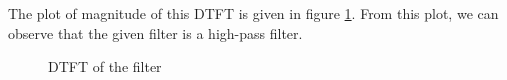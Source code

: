 \documentclass[journal,12pt,twocolumn]{IEEEtran}
\begin{document}
The plot of magnitude of this DTFT is given in figure \ref{DTFT}. From this plot, we can observe that the given filter is a high-pass filter.
\begin{figure}
    \centering
    \caption{DTFT of the filter}
    \label{DTFT}
\end{figure}
\end{document}
